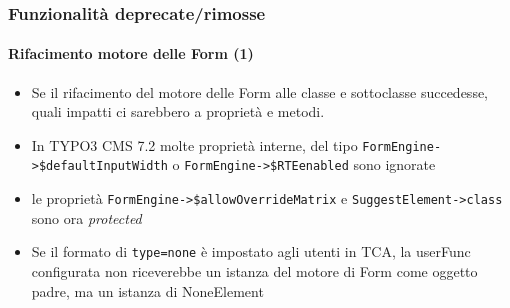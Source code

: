 \begin{frame}[fragile]
	\frametitle{Funzionalità deprecate/rimosse}
	\framesubtitle{Rifacimento motore delle Form (1)}

	\begin{itemize}

		\item Se il rifacimento del motore delle Form alle classe e sottoclasse succedesse,
			quali impatti ci sarebbero a proprietà e metodi.

		\item In TYPO3 CMS 7.2 molte proprietà interne, del tipo
			\small\texttt{FormEngine->\$defaultInputWidth}\normalsize\space
			o
			\small\texttt{FormEngine->\$RTEenabled}\normalsize\space\newline
			sono ignorate

		\item le proprietà
			\small\texttt{FormEngine->\$allowOverrideMatrix}\normalsize\space
			e
			\small\texttt{SuggestElement->class}\normalsize\space
			sono ora \textit{protected}

		\item Se il formato di \texttt{type=none} è impostato agli utenti in TCA, la
			userFunc configurata non riceverebbe un istanza del motore di Form come oggetto padre,
			ma un istanza di NoneElement

	\end{itemize}

\end{frame}


